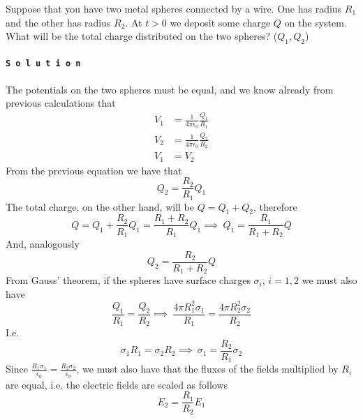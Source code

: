 \documentclass[../electromagnetism]{subfiles}
\begin{document}
\begin{exe}
	Suppose that you have two metal spheres connected by a wire. One has radius $R_1$ and the other has radius $R_2$. At $t>0$ we deposit some charge $Q$ on the system. What will be the total charge distributed on the two spheres? ($Q_1,Q_2$)\\\\
	\texttt{\textbf{S o l u t i o n}}\\\\
	The potentials on the two spheres must be equal, and we know already from previous calculations that
	\begin{equation}
		\begin{aligned}
			V_1&=\frac{1}{4\pi\epsilon_0}\frac{Q_1}{R_1}\\
			V_2&=\frac{1}{4\pi\epsilon_0}\frac{Q_2}{R_2}\\
			V_1&=V_2
		\end{aligned}
		\label{eq:spherepot}
	\end{equation}
	From the previous equation we have that
	\begin{equation}
		Q_2=\frac{R_2}{R_1}Q_1
		\label{eq:q2}
	\end{equation}
	The total charge, on the other hand, will be $Q=Q_1+Q_2$, therefore
	\begin{equation}
		Q=Q_1+\frac{R_2}{R_1}Q_1=\frac{R_1+R_2}{R_1}Q_1\implies\ Q_1=\frac{R_1}{R_1+R_2}Q
		\label{eq:totalcharge1}
	\end{equation}
	And, analogously
	\begin{equation}
		Q_2=\frac{R_2}{R_1+R_2}Q
		\label{eq:totalcharge2}
	\end{equation}
	From Gauss' theorem, if the spheres have surface charges $\sigma_i$, $i=1,2$ we must also have
	\begin{equation}
		\frac{Q_1}{R_1}=\frac{Q_2}{R_2}\implies\ \frac{4\pi R^2_1\sigma_1}{R_1}=\frac{4\pi R_2^2\sigma_2}{R_2}
		\label{eq:gausslaw2}
	\end{equation}
	I.e.
	\begin{equation*}
		\sigma_1R_1=\sigma_2R_2\implies\ \sigma_1=\frac{R_2}{R_1}\sigma_2
	\end{equation*}
	Since $\frac{R_1\sigma_1}{\epsilon_0}=\frac{R_2\sigma_2}{\epsilon_0}$, we must also have that the fluxes of the fields multiplied by $R_i$ are equal, i.e. the electric fields are scaled as follows
	\begin{equation}
		E_2=\frac{R_1}{R_2}E_1
		\label{eq:efield2spheres}
	\end{equation}
	\hfill\square
\end{exe}
\end{document}
